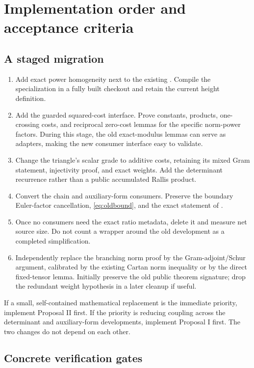 \section{Implementation order and acceptance criteria}

\subsection{A staged migration}

\begin{enumerate}
\item Add exact power homogeneity next to the existing
. Compile the specialization in a fully built
checkout and retain the current height definition.
\item Add the guarded squared-cost interface. Prove constants, products,
one-crossing costs, and reciprocal zero-cost lemmas for the specific
norm-power factors. During this stage, the old exact-modulus lemmas can
serve as adapters, making the new consumer interface easy to validate.
\item Change the triangle's scalar grade to additive costs, retaining its
mixed Gram statement, injectivity proof, and exact weights. Add the
determinant recurrence rather than a public accumulated Rallis product.
\item Convert the chain and auxiliary-form consumers. Preserve the
boundary Euler-factor cancellation, \eqref{eq:oldbound}, and the exact
statement of .
\item Once no consumers need the exact ratio metadata, delete it and
measure net source size. Do not count a wrapper around the old development
as a completed simplification.
\item Independently replace the branching norm proof by the
Gram-adjoint/Schur argument, calibrated by the existing Cartan norm
inequality or by the direct fixed-tensor lemma.
Initially preserve the old public theorem signature; drop the redundant
weight hypothesis in a later cleanup if useful.
\end{enumerate}

If a small, self-contained mathematical replacement is the immediate
priority, implement Proposal II first. If the priority is reducing
coupling across the determinant and auxiliary-form developments, implement
Proposal I first. The two changes do not depend on each other.

\subsection{Concrete verification gates}

